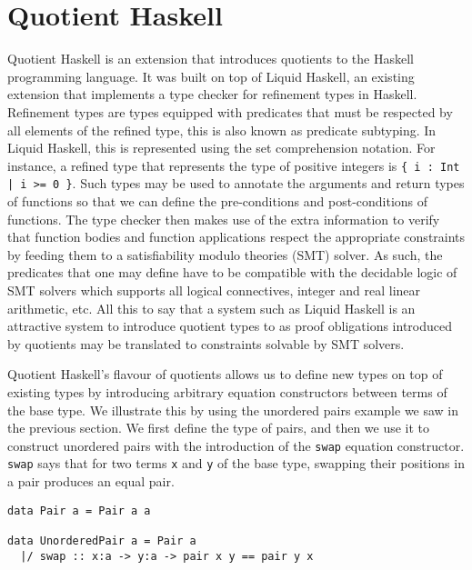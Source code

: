\documentclass[12pt,twoside,maitrise]{dms}
\theoremstyle{definition}
\numberwithin{equation}{section}
\numberwithin{table}{chapter}
\numberwithin{figure}{chapter}
\newcommand\id[1] {\texttt{#1}}
\newcommand\fn[1] {\texttt{#1}}
\begin{document}
\section{Quotient Haskell}\label{sec:related-qit}

Quotient Haskell\cite{hewer2023quotient} is an extension that introduces
quotients to the Haskell programming language. It was built on top of Liquid
Haskell\cite{vazou2016liquid}, an existing extension that implements a type
checker for refinement types in Haskell. Refinement types are types equipped
with predicates that must be respected by all elements of the refined type, this
is also known as predicate subtyping. In Liquid Haskell, this is represented
using the set comprehension notation. For instance, a refined type that
represents the type of positive integers is \fn{\{ i : Int | i >= 0 \}}. Such
types may be used to annotate the arguments and return types of functions so
that we can define the pre-conditions and post-conditions of functions. The type
checker then makes use of the extra information to verify that function bodies
and function applications respect the appropriate constraints by feeding them to
a satisfiability modulo theories (SMT) solver. As such, the predicates that one
may define have to be compatible with the decidable logic of SMT solvers which
supports all logical connectives, integer and real linear arithmetic, etc. All
this to say that a system such as Liquid Haskell is an attractive system to
introduce quotient types to as proof obligations introduced by quotients may be
translated to constraints solvable by SMT solvers.

Quotient Haskell's flavour of quotients allows us to define new types on top of
existing types by introducing arbitrary equation constructors between terms of
the base type. We illustrate this by using the unordered pairs example we saw in
the previous section. We first define the type of pairs, and
then we use it to construct unordered pairs with the introduction of the
\id{swap} equation constructor. \id{swap} says that for two terms \id{x} and
\id{y} of the base type, swapping their positions in a pair produces an equal
pair.

\begin{verbatim}
data Pair a = Pair a a

data UnorderedPair a = Pair a
  |/ swap :: x:a -> y:a -> pair x y == pair y x
\end{verbatim}
\end{document}
